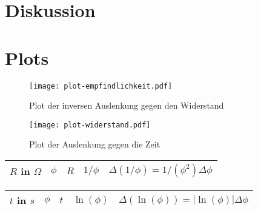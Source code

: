 \documentclass[11pt, ngerman]{article}
\begin{document}

\section{Diskussion}

%
%


\newpage

\section{Plots}

\begin{figure}[h!]
	\centering
	\texttt{[image: plot-empfindlichkeit.pdf]}
	\caption{Plot der inversen Auslenkung gegen den Widerstand}
\end{figure}

\begin{figure}[h!]
	\centering
	\texttt{[image: plot-widerstand.pdf]}
	\caption{Plot der Auslenkung gegen die Zeit}
\end{figure}

\begin{table}[h!]
	\centering
	\begin{tabular}{rr|rrr}
		$R$ in $\unit{\Omega}$ & $\phi$ & $R$ & $1/\phi$ & $\Delta (1/\phi) = 1/(\phi^2) \Delta \phi$ \\
		\hline
		
	\end{tabular}
\end{table}

\begin{table}[h!]
	\centering
	\begin{tabular}{rr|rrr}
		$t$ in $\unit{s}$ & $\phi$ & $t$ & $\ln(\phi)$ & $\Delta(\ln(\phi)) = |\ln(\phi)| \Delta \phi$ \\
		\hline
		
	\end{tabular}
\end{table}
\end{document}
